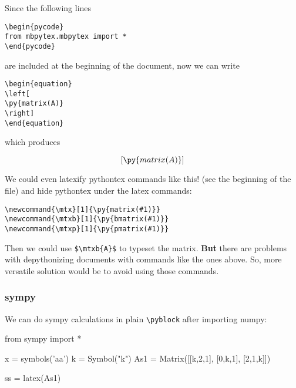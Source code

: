\documentclass[11pt]{article}
\begin{document}
Since the following lines 
\begin{verbatim}
\begin{pycode}
from mbpytex.mbpytex import *
\end{pycode}
\end{verbatim}
are included at the beginning of the document, now we can write

\begin{verbatim}
\begin{equation}
\left[
\py{matrix(A)}
\right]
\end{equation}
\end{verbatim}

which produces

\begin{equation}
\left[
\py{matrix(A)}
\right]
\end{equation}


\vspace{0.5cm}

We could even latexify pythontex commands like this! (see the beginning of the file) and hide pythontex under the latex commands:
\begin{verbatim}
\newcommand{\mtx}[1]{\py{matrix(#1)}}
\newcommand{\mtxb}[1]{\py{bmatrix(#1)}}
\newcommand{\mtxp}[1]{\py{pmatrix(#1)}}
\end{verbatim}

Then we could use \verb|$\mtxb{A}$| to typeset the matrix.
{\bf But } there are problems with depythonizing documents with commands like the ones above. So, more versatile solution would be to avoid using those commands.


\subsubsection{sympy}

We can do sympy calculations in plain \verb|\pyblock| after importing numpy:
\begin{pyblock}
from sympy import *

x = symbols('aa')
k = Symbol("k")
As1 = Matrix([[k,2,1],
              [0,k,1],
              [2,1,k]])

ss = latex(As1)
\end{pyblock}
\end{document}
